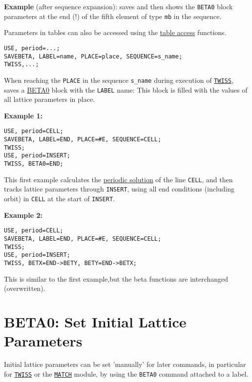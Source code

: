 \textbf{Example} (after sequence expansion): 
saves and then shows the \texttt{BETA0} block parameters at the end (!) of the
fifth element of type \texttt{mb} in the sequence.  


Parameters in tables can also be accessed 
using the \hyperref[chap:tables]{table access} functions. 
\begin{verbatim}
USE, period=...;
SAVEBETA, LABEL=name, PLACE=place, SEQUENCE=s_name;
TWISS,...;
\end{verbatim}

When reaching the \texttt{PLACE} in the
sequence \texttt{s\_name} during execution of
\hyperref[chap:twiss]{\texttt{TWISS}}, \madx saves a
\hyperref[sec:beta0]{BETA0} block with the \texttt{LABEL} name: This
block is filled with the values of all lattice parameters in place.   

\textbf{Example 1:} 
\begin{verbatim}
USE, period=CELL;
SAVEBETA, LABEL=END, PLACE=#E, SEQUENCE=CELL;
TWISS;
USE, period=INSERT;
TWISS, BETA0=END;
\end{verbatim}
This first example calculates the \hyperref[sec:twissperiod]{periodic
  solution} of the line \texttt{CELL}, and then tracks lattice parameters through
\texttt{INSERT}, using all end conditions (including orbit) in
\texttt{CELL} at the start of \texttt{INSERT}.  

\textbf{Example 2:} 
\begin{verbatim}
USE, period=CELL;
SAVEBETA, LABEL=END, PLACE=#E, SEQUENCE=CELL;
TWISS;
USE, period=INSERT;
TWISS, BETX=END->BETY, BETY=END->BETX;
\end{verbatim}
This is similar to the first example,but the beta functions are interchanged (overwritten).  

\section{BETA0: Set Initial Lattice Parameters}
\label{sec:beta0}
Initial lattice parameters can be set 'manually' for later commands, in
particular for \hyperref[chap:twiss]{\texttt{TWISS}} or the 
\hyperref[chap:match]{\texttt{MATCH}} module, by
using the \texttt{BETA0} command attached to a label.  


